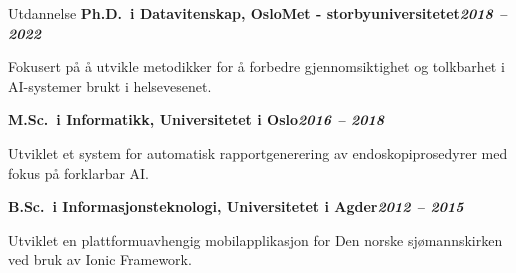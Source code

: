 \begin{rubric}{Utdannelse}
\entry*[]%
\textbf{Ph.D.~i Datavitenskap, OsloMet - storbyuniversitetet\hfill\textit{2018 -- 2022}} \par
\begin{compactitem}
    \item Fokusert på å utvikle metodikker for å forbedre gjennomsiktighet og tolkbarhet i AI-systemer brukt i helsevesenet.
    \vspace{-12pt}
\end{compactitem}
%
\entry*[]%
\textbf{M.Sc.~i Informatikk, Universitetet i Oslo\hfill\textit{2016 -- 2018}} \par
\begin{compactitem}
    \item Utviklet et system for automatisk rapportgenerering av endoskopiprosedyrer med fokus på forklarbar AI.
    \vspace{-12pt}
\end{compactitem}
% 
\entry*[]%
\textbf{B.Sc.~i Informasjonsteknologi, Universitetet i Agder\hfill\textit{2012 -- 2015}} \par
\begin{compactitem}
\item Utviklet en plattformuavhengig mobilapplikasjon for Den norske sjømannskirken ved bruk av Ionic Framework.
\end{compactitem}
\end{rubric}
